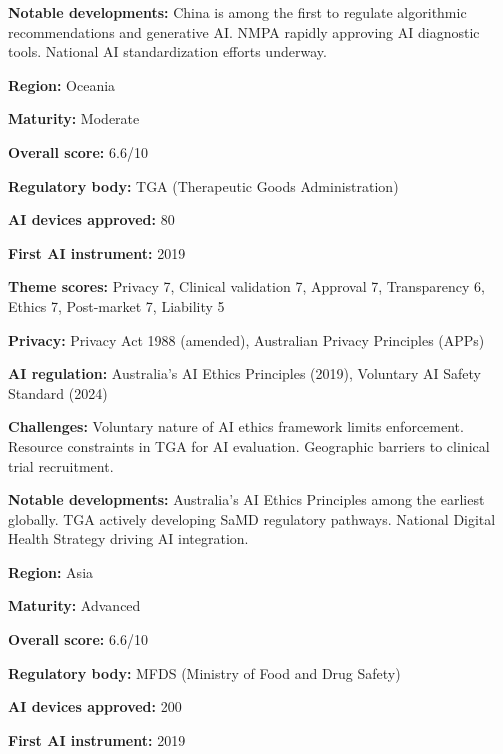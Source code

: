 \noindent\textbf{Notable developments:} China is among the first to regulate algorithmic recommendations and generative AI. NMPA rapidly approving AI diagnostic tools. National AI standardization efforts underway.\par
\vspace{0.55em}
\par
\vspace{0.15em}
\noindent\textbf{Region:} Oceania\par
\noindent\textbf{Maturity:} Moderate\par
\noindent\textbf{Overall score:} 6.6/10\par
\noindent\textbf{Regulatory body:} TGA (Therapeutic Goods Administration)\par
\noindent\textbf{AI devices approved:} 80\par
\noindent\textbf{First AI instrument:} 2019\par
\noindent\textbf{Theme scores:} Privacy 7, Clinical validation 7, Approval 7, Transparency 6, Ethics 7, Post-market 7, Liability 5\par
\noindent\textbf{Privacy:} Privacy Act 1988 (amended), Australian Privacy Principles (APPs)\par
\noindent\textbf{AI regulation:} Australia's AI Ethics Principles (2019), Voluntary AI Safety Standard (2024)\par
\noindent\textbf{Challenges:} Voluntary nature of AI ethics framework limits enforcement. Resource constraints in TGA for AI evaluation. Geographic barriers to clinical trial recruitment.\par
\noindent\textbf{Notable developments:} Australia's AI Ethics Principles among the earliest globally. TGA actively developing SaMD regulatory pathways. National Digital Health Strategy driving AI integration.\par
\vspace{0.55em}
\par
\vspace{0.15em}
\noindent\textbf{Region:} Asia\par
\noindent\textbf{Maturity:} Advanced\par
\noindent\textbf{Overall score:} 6.6/10\par
\noindent\textbf{Regulatory body:} MFDS (Ministry of Food and Drug Safety)\par
\noindent\textbf{AI devices approved:} 200\par
\noindent\textbf{First AI instrument:} 2019\par
